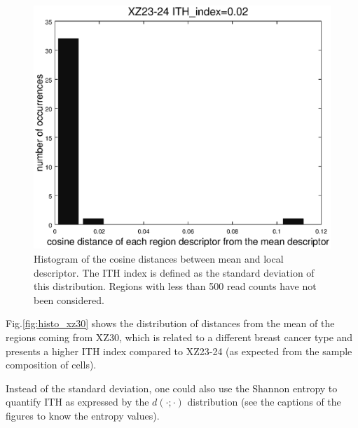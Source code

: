 \documentclass[11pt,a4paper]{article}
\begin{document}
\begin{figure}[hbtp]
\centering
\includegraphics[scale=0.5]{histo_xz2324.eps}
\caption{Histogram of the cosine distances between mean and local descriptor. The ITH index is defined as the standard deviation of this distribution. Regions with less than 500 read counts have not been considered.}
\label{fig:histo_big}
\end{figure}

Fig.\ref{fig:histo_xz30} shows the distribution of distances from the mean of the regions coming from XZ30, which is related to a different breast cancer type and presents a higher ITH index compared to XZ23-24 (as expected from the sample composition of cells).

Instead of the standard deviation, one could also use the Shannon entropy to quantify ITH as expressed by the $d(\cdot;\cdot)$ distribution (see the captions of the figures to know the entropy values). 
\end{document}
